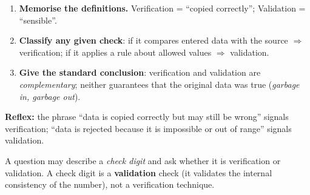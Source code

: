 \documentclass[11pt]{article}
\begin{document}
\begin{methode}
\begin{enumerate}
\item \textbf{Memorise the definitions.} Verification = ``copied correctly''; Validation = ``sensible''.
\item \textbf{Classify any given check}: if it compares entered data with the source $\Rightarrow$ verification; if it applies a rule about allowed values $\Rightarrow$ validation.
\item \textbf{Give the standard conclusion}: verification and validation are \emph{complementary}; neither guarantees that the original data was true (\emph{garbage in, garbage out}).
\end{enumerate}
\textbf{Reflex:} the phrase ``data is copied correctly but may still be wrong'' signals verification; ``data is rejected because it is impossible or out of range'' signals validation.
\end{methode}

\begin{attention}
A question may describe a \emph{check digit} and ask whether it is verification or validation. A check digit is a \textbf{validation} check (it validates the internal consistency of the number), not a verification technique.
\end{attention}
\end{document}
